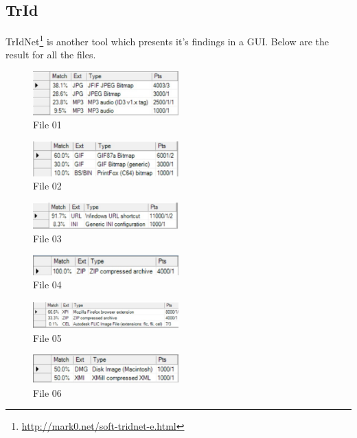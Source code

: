 \documentclass[a4paper,10pt,oneside]{article}
\begin{document}
\subsection{TrId}
TrIdNet\footnote{\url{http://mark0.net/soft-tridnet-e.html}} is another tool which presents it's findings in a GUI. Below are the result for all the files.
\newpage
\begin{figure}[!ht]
        \caption{File 01}
        \centering
        \includegraphics[width=0.5\textwidth]{01}
\end{figure}
\begin{figure}[!ht]
        \centering
        \includegraphics[width=0.5\textwidth]{02}
        \caption{File 02}
\end{figure}
\begin{figure}[!ht]
        \centering
        \includegraphics[width=0.5\textwidth]{03}
        \caption{File 03}
\end{figure}
\begin{figure}[!ht]
        \centering
        \includegraphics[width=0.5\textwidth]{04}
        \caption{File 04}
\end{figure}
\begin{figure}[!ht]
        \centering
        \includegraphics[width=0.5\textwidth]{05}
        \caption{File 05}
\end{figure}
\begin{figure}[!ht]
        \centering
        \includegraphics[width=0.5\textwidth]{06}
        \caption{File 06}
\end{figure}
\end{document}
